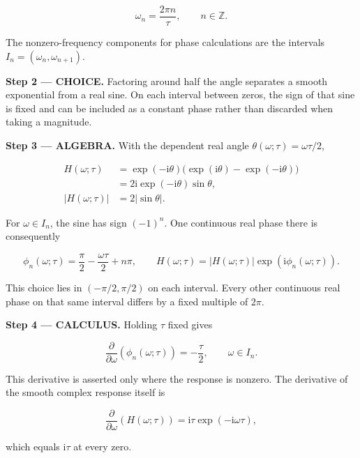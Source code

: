 \documentclass[11pt,oneside,openany]{book}
\begin{document}
\[
\omega_n=\frac{2\pi n}{\tau},\qquad n\in\mathbb Z.
\]

The nonzero-frequency components for phase calculations are the intervals \(I_n=(\omega_n,\omega_{n+1})\).

\begin{ChoiceStep}
\textbf{Step 2 --- CHOICE.} Factoring around half the angle separates a smooth exponential from a real sine. On each interval between zeros, the sign of that sine is fixed and can be included as a constant phase rather than discarded when taking a magnitude.

\end{ChoiceStep}
\begingroup\color{AlgebraBlue}
\textbf{Step 3 --- ALGEBRA.} With the dependent real angle \(\theta(\omega;\tau)=\omega\tau/2\),

\[
\begin{aligned}
H(\omega;\tau)
&=\exp(-\mathrm i\theta)\bigl(\exp(\mathrm i\theta)-\exp(-\mathrm i\theta)\bigr)\\
&=2\mathrm i\exp(-\mathrm i\theta)\sin\theta,\\
|H(\omega;\tau)|&=2|\sin\theta|.
\end{aligned}
\]

For \(\omega\in I_n\), the sine has sign \((-1)^n\). One continuous real phase there is consequently

\[
\phi_n(\omega;\tau)=\frac\pi2-\frac{\omega\tau}{2}+n\pi,
\qquad
H(\omega;\tau)=|H(\omega;\tau)|\exp(\mathrm i\phi_n(\omega;\tau)).
\]

This choice lies in \((-\pi/2,\pi/2)\) on each interval. Every other continuous real phase on that same interval differs by a fixed multiple of \(2\pi\).

\endgroup
\textbf{Step 4 --- CALCULUS.} Holding \(\tau\) fixed gives

\[
\frac{\partial}{\partial\omega}\left(\phi_n(\omega;\tau)\right)=-\frac\tau2,
\qquad \omega\in I_n.
\]

This derivative is asserted only where the response is nonzero. The derivative of the smooth complex response itself is

\[
\frac{\partial}{\partial\omega}\left(H(\omega;\tau)\right)
=\mathrm i\tau\exp(-\mathrm i\omega\tau),
\]

which equals \(\mathrm i\tau\) at every zero.
\end{document}
